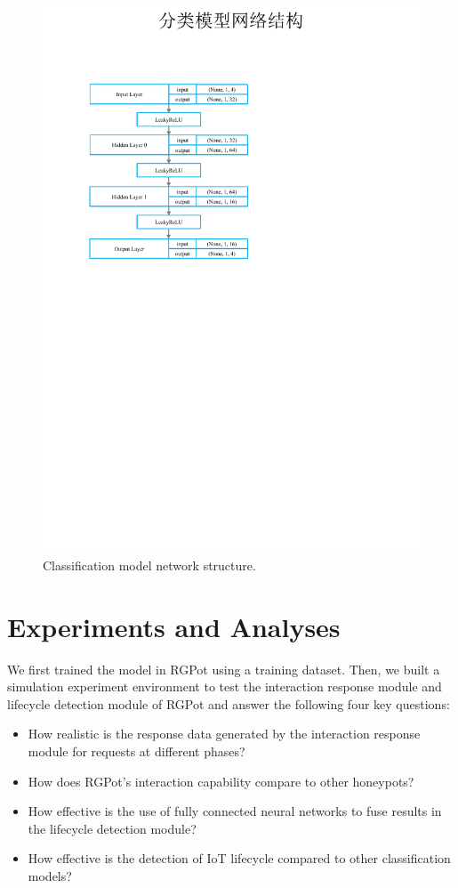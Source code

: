 \documentclass[journal]{IEEEtai}
\begin{document}
\begin{figure}[!h]
	\centering
	\includegraphics[width = 0.7\linewidth]{Figures/fusion layer.pdf}
	\caption{Classification model network structure.}
	\label{fusion layer}
\end{figure}




\section{Experiments and Analyses}

We first trained the model in RGPot using a training dataset.
Then, we built a simulation experiment environment to test the interaction response module and lifecycle detection module of RGPot and answer the following four key questions:
\begin{itemize}
    \item How realistic is the response data generated by the interaction response module for requests at different phases?
    \item How does RGPot's interaction capability compare to other honeypots?
    \item How effective is the use of fully connected neural networks to fuse results in the lifecycle detection module?
    \item How effective is the detection of IoT lifecycle compared to other classification models?
\end{itemize}
\end{document}
